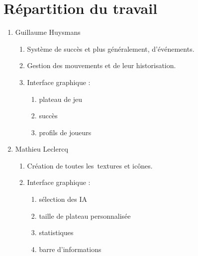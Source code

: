 \section{Répartition du travail}
\begin{enumerate}

\item Guillaume Huysmans
\begin{enumerate}
	\item Système de succès et plus généralement, d'événements.
    \item Gestion des mouvements et de leur historisation.
    \item Interface graphique :
    \begin{enumerate}
        \item plateau de jeu
        \item succès
        \item profils de joueurs
    \end{enumerate}
\end{enumerate}

\item Mathieu Leclercq
\begin{enumerate}
	\item Création de toutes les~textures et icônes.
    \item Interface graphique : 
    \begin{enumerate}
        \item sélection des IA
        \item taille de plateau personnalisée
        \item statistiques
        \item barre d'informations
    \end{enumerate}
\end{enumerate}

\end{enumerate}
